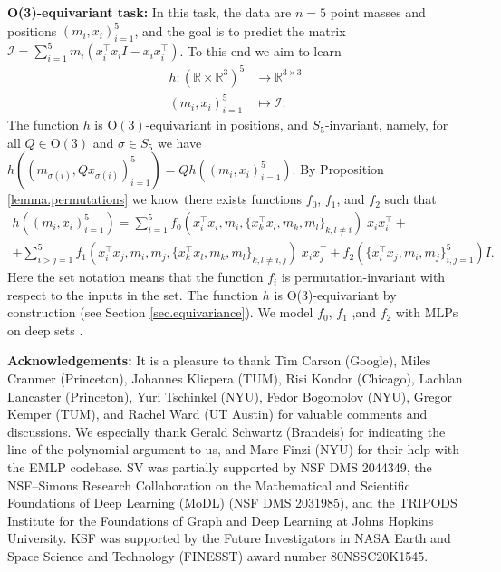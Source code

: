 \documentclass{article}
\renewcommand{\paragraph}[1]{\par\textbf{#1}}
\theoremstyle{Hogg}
\begin{document}
\paragraph{O(3)-equivariant task:}
In this task, the data are $n=5$ point masses and positions $(m_i,x_i)_{i=1}^5$, and the goal is to predict the matrix $\mathcal{I} =\sum_{i=1}^5 m_i(x_i^\top x_i I- x_ix_i^\top)$. To this end we aim to learn
\begin{equation}
\begin{aligned}
    h: (\mathbb R\times \mathbb{R}^3)^5   &\to \mathbb R^{3\times 3}  \\
    (m_i,x_i)_{i=1}^5 &\mapsto  \mathcal{I} .
\end{aligned}\label{eq:goal_equiv}
\end{equation} 
The function $h$ is $\mathrm{O}(3)$-equivariant in positions, and $S_5$-invariant, namely, for all $Q\in \mathrm{O}(3)$ and $\sigma \in S_5$ we have
$
    h((m_{\sigma(i)},Qx_{\sigma(i)})_{i=1}^5)=Qh((m_i,x_i)_{i=1}^5).
$
By Proposition \ref{lemma.permutations} we know there exists functions $f_0$, $f_1$, and $f_2$ such that  
\begin{multline*}
    h((m_i,x_i)_{i=1}^5) = \sum_{i=1}^5 f_{0}( x_i^\top x_i, m_i, \{x_k^\top x_l,m_k, m_l\}_{k,l\neq i})\; x_ix_i^\top +
    \\
    +\sum_{i>j=1}^5f_{1}( x_i^\top x_j, m_i,m_j, \{x_k^\top x_l,m_k, m_l\}_{k,l\neq i,j})\; x_ix_j^\top +
    f_2(\{x_i^\top x_j, m_i,m_j\}_{i,j=1}^5) I.
\end{multline*}
Here the set notation means that the function $f_i$ is permutation-invariant with respect to the inputs in the set. The function $h$ is O(3)-equivariant by construction (see Section \ref{sec.equivariance}).
We model $f_0$, $f_1$ ,and $f_2$ with MLPs on deep sets \cite{zaheer2017deepsets}. 


\paragraph{Acknowledgements:}
It is a pleasure to thank Tim Carson (Google), Miles Cranmer (Princeton), Johannes Klicpera (TUM), Risi Kondor (Chicago), Lachlan Lancaster (Princeton), Yuri Tschinkel (NYU), Fedor Bogomolov (NYU), Gregor Kemper (TUM), and Rachel Ward (UT Austin) for valuable comments and discussions. We especially thank Gerald Schwartz (Brandeis) for indicating the line of the polynomial argument to us, and Marc Finzi (NYU) for their help with the EMLP codebase. SV was partially supported by NSF DMS 2044349, the NSF–Simons Research Collaboration on the Mathematical and Scientific Foundations of Deep Learning (MoDL) (NSF DMS 2031985), and the TRIPODS Institute for the Foundations of Graph and Deep Learning at Johns Hopkins University. KSF was supported by the Future Investigators in NASA Earth and Space Science and Technology (FINESST) award number 80NSSC20K1545.
\end{document}
